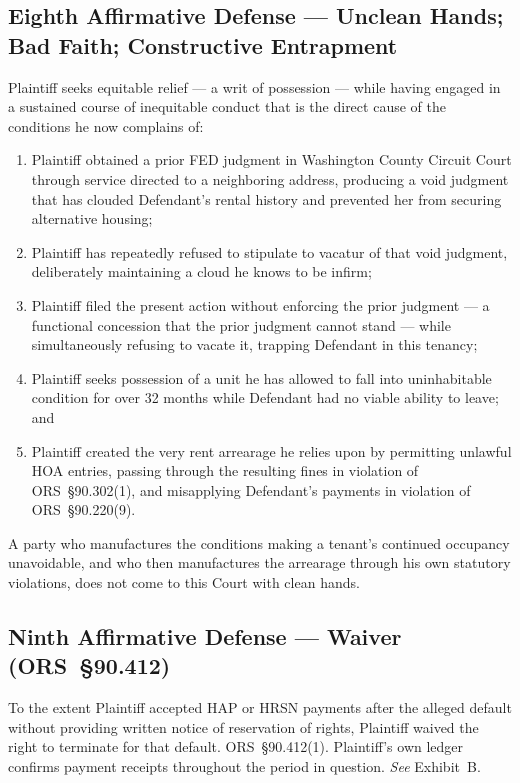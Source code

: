 \documentclass[10pt,letterpaper,oneside]{extarticle}
\begin{document}
\subsection{\textbf{Eighth Affirmative Defense ---
		Unclean Hands; Bad Faith;
		Constructive Entrapment}}
Plaintiff seeks equitable relief --- a writ of possession
--- while having engaged in a sustained course of
inequitable conduct that is the direct cause of the
conditions he now complains of:
\begin{enumerate}[label=(\arabic*),leftmargin=.5in,
noitemsep]
	\item Plaintiff obtained a prior FED judgment in
	Washington County Circuit Court through service
	directed to a neighboring address, producing a void
	judgment that has clouded Defendant's rental history
	and prevented her from securing alternative housing;
	\item Plaintiff has repeatedly refused to stipulate to
	vacatur of that void judgment, deliberately maintaining
	a cloud he knows to be infirm;
	\item Plaintiff filed the present action without
	enforcing the prior judgment --- a functional
	concession that the prior judgment cannot stand ---
	while simultaneously refusing to vacate it, trapping
	Defendant in this tenancy;
	\item Plaintiff seeks possession of a unit he has
	allowed to fall into uninhabitable condition for over
	32 months while Defendant had no viable ability to
	leave; and
	\item Plaintiff created the very rent arrearage he
	relies upon by permitting unlawful HOA entries,
	passing through the resulting fines in violation of
	ORS~\S90.302(1), and misapplying Defendant's payments
	in violation of ORS~\S90.220(9).
\end{enumerate}
\vspace{-1em}
\indent A party who manufactures the conditions making a
tenant's continued occupancy unavoidable, and who then
manufactures the arrearage through his own statutory
violations, does not come to this Court with clean hands.
\subsection{\textbf{Ninth Affirmative Defense ---
		Waiver (ORS~\S90.412)}}
To the extent Plaintiff accepted HAP or HRSN payments after
the alleged default without providing written notice of
reservation of rights, Plaintiff waived the right to
terminate for that default. ORS~\S90.412(1). Plaintiff's
own ledger confirms payment receipts throughout the period
in question. \textit{See} Exhibit~B.
\end{document}
